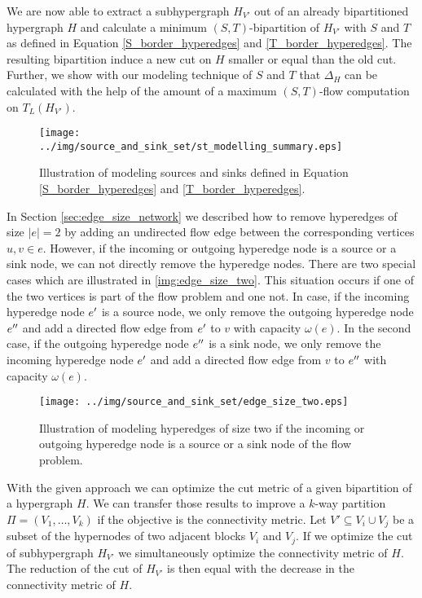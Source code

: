 We are now able to extract a subhypergraph $H_{V'}$ out of an already bipartitioned hypergraph $H$ and
calculate a minimum $(S,T)$-bipartition of $H_{V'}$ with $S$ and $T$ as defined
in Equation \ref{S_border_hyperedges} and \ref{T_border_hyperedges}. The resulting
bipartition induce a new cut on $H$ smaller or equal than the old cut. Further, we show with our
modeling technique of $S$ and $T$ that $\Delta_H$ can be calculated with the help of the amount 
of a maximum $(S,T)$-flow computation on $T_L(H_{V'})$. \\
\begin{figure}[ht!]
\centering
\texttt{[image: ../img/source\_and\_sink\_set/st\_modelling\_summary.eps]}
\caption{Illustration of modeling sources and sinks defined in Equation \ref{S_border_hyperedges}
         and \ref{T_border_hyperedges}. }
\label{img:st_modelling_summary}
\end{figure}
In Section \ref{sec:edge_size_network} we described how to remove hyperedges of size $|e| = 2$ 
by adding an undirected flow edge between the corresponding vertices $u,v \in e$. However, if
the incoming or outgoing hyperedge node is a source or a sink node, we can not directly
remove the hyperedge nodes. There are two special cases which are illustrated
in \autoref{img:edge_size_two}. This situation occurs if one of the two vertices is part
of the flow problem and one not. In case, if the incoming hyperedge node $e'$ is a source node, 
we only remove the outgoing hyperedge node $e''$ and add a directed flow edge from $e'$ 
to $v$ with capacity $\omega(e)$. In the second case, if the outgoing hyperedge node $e''$ is
a sink node, we only remove the incoming hyperedge node $e'$ and add a directed flow edge from
$v$ to $e''$ with capacity $\omega(e)$.\\
\begin{figure}
\centering
\texttt{[image: ../img/source\_and\_sink\_set/edge\_size\_two.eps]}
\caption{Illustration of modeling hyperedges of size two if the incoming or outgoing
         hyperedge node is a source or a sink node of the flow problem.}
\label{img:edge_size_two}
\end{figure}
With the given approach we can optimize the cut metric of a given
bipartition of a hypergraph $H$. We can transfer those results to improve
a $k$-way partition $\Pi = (V_1,\ldots,V_k)$ if the objective is the connectivity
metric. Let $V' \subseteq V_i \cup V_j$ be a subset of the hypernodes of two adjacent
blocks $V_i$ and $V_j$. If we optimize the cut of
subhypergraph $H_{V'}$ we simultaneously optimize the connectivity metric of $H$.
The reduction of the cut of $H_{V'}$ is then equal with the decrease in
the connectivity metric of $H$.

